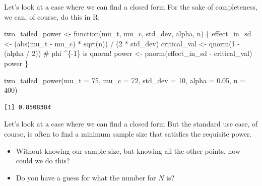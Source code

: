 \documentclass[
  ignorenonframetext,
  aspectratio=169,
]{beamer}
\newenvironment{Shaded}{\begin{snugshade}}{\end{snugshade}}
\newcommand{\AttributeTok}[1]{\textcolor[rgb]{0.40,0.45,0.13}{#1}}
\newcommand{\CommentTok}[1]{\textcolor[rgb]{0.37,0.37,0.37}{#1}}
\newcommand{\ControlFlowTok}[1]{\textcolor[rgb]{0.00,0.23,0.31}{#1}}
\newcommand{\DecValTok}[1]{\textcolor[rgb]{0.68,0.00,0.00}{#1}}
\newcommand{\FloatTok}[1]{\textcolor[rgb]{0.68,0.00,0.00}{#1}}
\newcommand{\FunctionTok}[1]{\textcolor[rgb]{0.28,0.35,0.67}{#1}}
\newcommand{\NormalTok}[1]{\textcolor[rgb]{0.00,0.23,0.31}{#1}}
\newcommand{\OtherTok}[1]{\textcolor[rgb]{0.00,0.23,0.31}{#1}}
\newcommand{\SpecialCharTok}[1]{\textcolor[rgb]{0.37,0.37,0.37}{#1}}
\providecommand{\tightlist}{%
  \setlength{\itemsep}{0pt}\setlength{\parskip}{0pt}}\usepackage{longtable,booktabs,array}
\begin{document}
\begin{frame}[fragile]{Let's look at a case where we can find a closed
form}
\label{lets-look-at-a-case-where-we-can-find-a-closed-form-4}
For the sake of completeness, we can, of course, do this in R:

\begin{Shaded}
\begin{Highlighting}[]
\NormalTok{two\_tailed\_power }\OtherTok{\textless{}{-}} \ControlFlowTok{function}\NormalTok{(mu\_t, mu\_c, std\_dev, alpha, n) \{}
\NormalTok{    effect\_in\_sd }\OtherTok{\textless{}{-}}\NormalTok{ (}\FunctionTok{abs}\NormalTok{(mu\_t }\SpecialCharTok{{-}}\NormalTok{ mu\_c) }\SpecialCharTok{*} \FunctionTok{sqrt}\NormalTok{(n)) }\SpecialCharTok{/}\NormalTok{ (}\DecValTok{2} \SpecialCharTok{*}\NormalTok{ std\_dev)}
\NormalTok{    critical\_val }\OtherTok{\textless{}{-}} \FunctionTok{qnorm}\NormalTok{(}\DecValTok{1} \SpecialCharTok{{-}}\NormalTok{ (alpha }\SpecialCharTok{/} \DecValTok{2}\NormalTok{)) }\CommentTok{\# phi \^{}\{{-}1\} is qnorm!}
\NormalTok{    power }\OtherTok{\textless{}{-}} \FunctionTok{pnorm}\NormalTok{(effect\_in\_sd }\SpecialCharTok{{-}}\NormalTok{ critical\_val)}
\NormalTok{    power}
\NormalTok{\}}

\FunctionTok{two\_tailed\_power}\NormalTok{(}\AttributeTok{mu\_t =} \DecValTok{75}\NormalTok{, }\AttributeTok{mu\_c =} \DecValTok{72}\NormalTok{, }\AttributeTok{std\_dev =} \DecValTok{10}\NormalTok{, }\AttributeTok{alpha =} \FloatTok{0.05}\NormalTok{, }\AttributeTok{n =} \DecValTok{400}\NormalTok{)}
\end{Highlighting}
\end{Shaded}

\begin{verbatim}
[1] 0.8508384
\end{verbatim}
\end{frame}

\begin{frame}{Let's look at a case where we can find a closed form}
\label{lets-look-at-a-case-where-we-can-find-a-closed-form-5}
But the standard use case, of course, is often to find a minimum sample
size that satisfies the requisite power.

\begin{itemize}
\tightlist
\item
  Without knowing our sample size, but knowing all the other points, how
  could we do this?
\item
  Do you have a guess for what the number for \(N\) is?
\end{itemize}
\end{frame}
\end{document}
